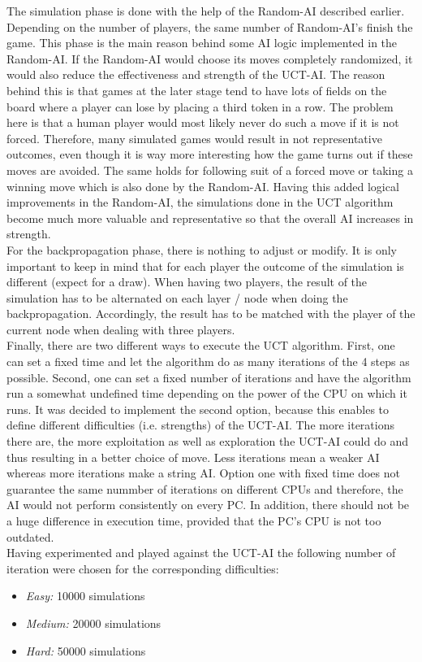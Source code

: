 \documentclass[german]{report}
\begin{document}
The simulation phase is done with the help of the Random-AI described earlier.
Depending on the number of players, the same number of Random-AI's finish the
game. This phase is the main reason behind some AI logic implemented in the
Random-AI. If the Random-AI would choose its moves completely randomized, it
would also reduce the effectiveness and strength of the UCT-AI. The reason
behind this is that games at the later stage tend to have lots of fields on the
board where a player can lose by placing a third token in a row. The problem
here is that a human player would most likely never do such a move if it is not
forced. Therefore, many simulated games would result in not representative
outcomes, even though it is way more interesting how the game turns out if these
moves are avoided. The same holds for following suit of a forced move or taking
a winning move which is also done by the Random-AI. Having this added logical
improvements in the Random-AI, the simulations done in the UCT algorithm become
much more valuable and representative so that the overall AI increases in
strength.\\

For the backpropagation phase, there is nothing to adjust or modify. It is only
important to keep in mind that for each player the outcome of the simulation is
different (expect for a draw). When having two players, the result of the
simulation has to be alternated on each layer / node when doing the
backpropagation. Accordingly, the result has to be matched with the player of
the current node when dealing with three players.\\

Finally, there are two different ways to execute the UCT algorithm. First, one
can set a fixed time and let the algorithm do as many iterations of the 4 steps
as possible. Second, one can set a fixed number of iterations and have the
algorithm run a somewhat undefined time depending on the power of the CPU on
which it runs. It was decided to implement the second option, because this
enables to define different difficulties (i.e. strengths) of the UCT-AI.
The more iterations there are, the more exploitation as well as exploration the
UCT-AI could do and thus resulting in a better choice of move. Less iterations
mean a weaker AI whereas more iterations make a string AI. Option one with fixed
time does not guarantee the same nummber of iterations on different CPUs and
therefore, the AI would not perform consistently on every PC. In addition, there
should not be a huge difference in execution time, provided that the PC's CPU is
not too outdated. \\

Having experimented and played against the UCT-AI the following number of
iteration were chosen for the corresponding difficulties:
\begin{itemize}
	\item \textit{Easy:} 10000 simulations
	\item \textit{Medium:}  20000 simulations
	\item \textit{Hard:}  50000 simulations
\end{itemize}


\end{document}
